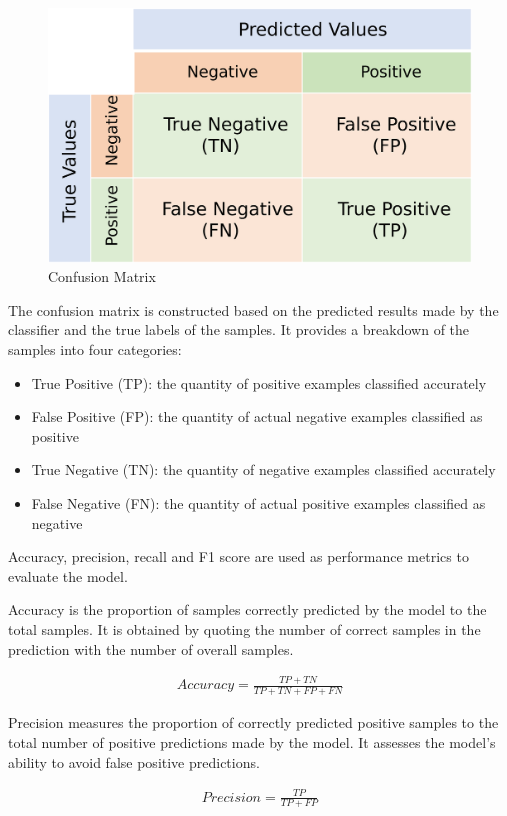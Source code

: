 \documentclass[ %
                    author={Bocheng Wang},
                supervisor={Dr. Qiang Liu},
                    degree={MSc},
                     title={A Research on Identification of Suicide Ideation in Texts with Multiple Models},
                      type={},
                      year={2024}]{dissertation}
\begin{document}
\begin{figure}[h]
      \centering
      \includegraphics[width=0.6\linewidth]{../img/confusion matrix.eps}
      \caption{Confusion Matrix}
      \label{fig:confusion matrix}
\end{figure}

The confusion matrix is constructed based on the predicted results made by the classifier and the true labels of the samples. It provides a breakdown of the samples into four categories:

\begin{itemize}
      \item True Positive (TP): the quantity of positive examples classified accurately
      \item False Positive (FP): the quantity of actual negative examples classified as positive
      \item True Negative (TN): the quantity of negative examples classified accurately
      \item False Negative (FN): the quantity of actual positive examples classified as negative
\end{itemize}

Accuracy, precision, recall and F1 score are used as performance metrics to evaluate the model. 

Accuracy is the proportion of samples correctly predicted by the model to the total samples. It is obtained by quoting the number of correct samples in the prediction with the number of overall samples.

\begin{eqnarray}
      Accuracy = \frac{TP + TN}{TP + TN + FP + FN}
      \label{acc}
\end{eqnarray}

Precision measures the proportion of correctly predicted positive samples to the total number of positive predictions made by the model. It assesses the model's ability to avoid false positive predictions.

\begin{eqnarray}
      Precision = \frac{TP}{TP + FP}
      \label{pre}
\end{eqnarray}
\end{document}
